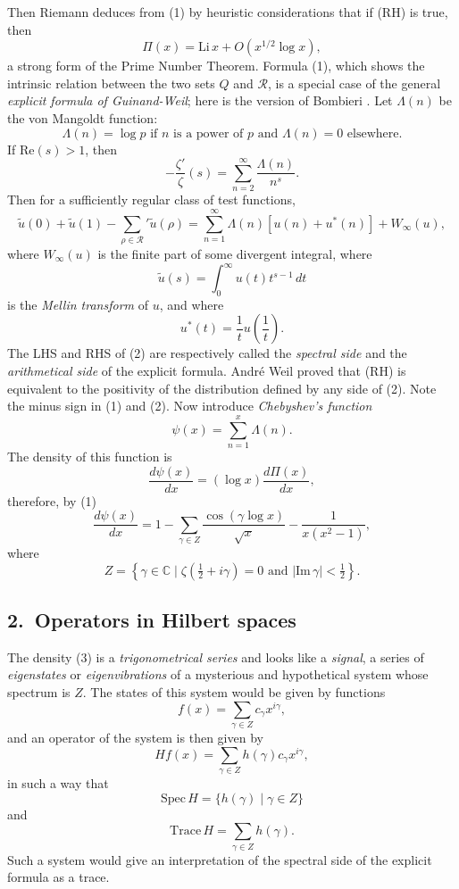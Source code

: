 \documentclass[12pt]{article}
\begin{document}
Then Riemann deduces from (1) by heuristic considerations that if (RH) is true, then
\[
\Pi(x) = \mathrm{Li}\, x + O(x^{1/2} \log x),
\]
a strong form of the Prime Number Theorem. Formula (1), which shows the intrinsic relation between the two sets $Q$ and $\mathcal{R}$, is a special case of the general \emph{explicit formula of Guinand-Weil}; here is the version of Bombieri \cite{B}. Let $\Lambda(n)$ be the von Mangoldt function:
\[
\Lambda(n) = \log p \text{ if } n \text{ is a power of } p \text{ and } \Lambda(n) = 0 \text{ elsewhere}.
\]
If $\mathrm{Re}(s) > 1$, then
\[
- \frac{\zeta'}{\zeta}(s) = \sum_{n=2}^{\infty} \frac{\Lambda(n)}{n^s}.
\]
Then for a sufficiently regular class of test functions,
\begin{equation}
\tilde{u}(0) + \tilde{u}(1) - \sum_{\rho \in \mathcal{R}}' \tilde{u}(\rho)
 = \sum_{n=1}^{\infty} \Lambda(n) [u(n) + u^*(n)] + W_{\infty}(u),
\tag{2}
\end{equation}
where $W_{\infty}(u)$ is the finite part of some divergent integral, where
\[
\tilde{u}(s) = \int_0^{\infty} u(t) t^{s-1}\,dt
\]
is the \emph{Mellin transform} of $u$, and where
\[
u^*(t) = \frac{1}{t} u\left(\frac{1}{t}\right).
\]
The LHS and RHS of (2) are respectively called the \emph{spectral side} and the \emph{arithmetical side} of the explicit formula. André Weil proved that (RH) is equivalent to the positivity of the distribution defined by any side of (2). Note the minus sign in (1) and (2). Now introduce \emph{Chebyshev's function}
\[
\psi(x) = \sum_{n=1}^x \Lambda(n).
\]
The density of this function is
\[
\frac{d\psi(x)}{dx} = (\log x) \frac{d\Pi(x)}{dx},
\]
therefore, by (1)
\begin{equation}
\frac{d\psi(x)}{dx} = 1 - \sum_{\gamma \in Z} \frac{\cos(\gamma \log x)}{\sqrt{x}} - \frac{1}{x(x^2 - 1)},
\tag{3}
\end{equation}
where
\[
Z = \left\{\gamma \in \mathbb{C} \mid \zeta\left(\tfrac{1}{2} + i\gamma\right) = 0 \text{ and } |\mathrm{Im}\,\gamma| < \tfrac{1}{2}\right\}.
\]

\subsection*{2.\ Operators in Hilbert spaces}

The density (3) is a \emph{trigonometrical series} and looks like a \emph{signal}, a series of \emph{eigenstates} or \emph{eigenvibrations} of a mysterious and hypothetical system whose spectrum is $Z$. The states of this system would be given by functions
\[
f(x) = \sum_{\gamma \in Z} c_{\gamma} x^{i\gamma},
\]
and an operator of the system is then given by
\[
Hf(x) = \sum_{\gamma \in Z} h(\gamma) c_{\gamma} x^{i\gamma},
\]
in such a way that
\[
\mathrm{Spec}\, H = \{h(\gamma) \mid \gamma \in Z\}
\]
and
\[
\mathrm{Trace}\, H = \sum_{\gamma \in Z} h(\gamma).
\]
Such a system would give an interpretation of the spectral side of the explicit formula as a trace.
\end{document}

